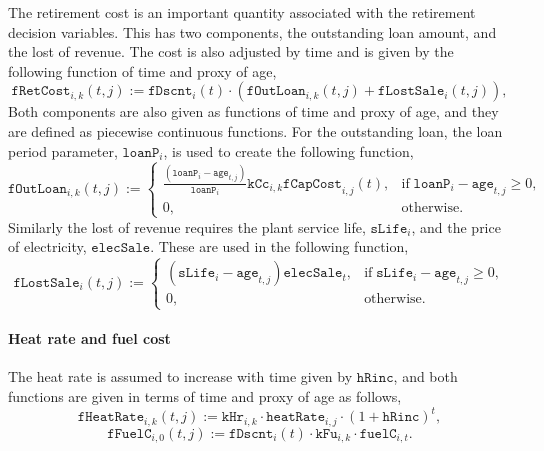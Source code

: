 \documentclass{amsart}
\begin{document}
\begin{appendices}
%
The retirement cost is an important quantity associated with the retirement
decision variables. This has two components, the outstanding loan amount, and
the lost of revenue. The cost is also adjusted by time and is given by the 
following function of time and proxy of age,
%
\begin{equation}
    \mathtt{fRetCost}_{i,k}\!\left(t,j\right):= 
    \mathtt{fDscnt}_i\!\left(t\right) \cdot
    \left(
    \mathtt{fOutLoan}_{i,k}\!\left(t,j\right) +
    \mathtt{fLostSale}_i\!\left(t,j\right)
    \right),
\end{equation}
%
Both components are also given as functions of time and proxy of age, and they
are defined as piecewise continuous functions. For the outstanding loan, the
loan period parameter, $\mathtt{loanP}_i$, is used to create the following
function,
%
\begin{equation}
    \mathtt{fOutLoan}_{i,k}\!\left(t,j\right) :=
    \left\{
        \begin{matrix}
            \frac{\left(\mathtt{loanP}_i - \mathtt{age}_{t,j}\right)}
            {\mathtt{loanP}_i} 
            \mathtt{kCc}_{i,k} \mathtt{fCapCost}_{i,j}(t), & 
            \text{if}\; \mathtt{loanP}_i-\mathtt{age}_{t,j}\geq 0 ,\\
            0, & \text{otherwise}.
        \end{matrix}
    \right.
\end{equation}
%
Similarly the lost of revenue requires the plant service life, 
$\mathtt{sLife}_i$, and the price of electricity, $\mathtt{elecSale}$. These
are used in the following function,
%
\begin{equation}
    \mathtt{fLostSale}_i\!\left(t,j\right) :=
    \left\{
        \begin{matrix}
            \left(\mathtt{sLife}_i - \mathtt{age}_{t,j}\right) 
            \mathtt{elecSale}_t, & 
            \text{if}\; \mathtt{sLife}_i-\mathtt{age}_{t,j} \geq 0 ,\\
            0, & \text{otherwise}.
        \end{matrix}
    \right.
\end{equation}
%
    \paragraph{Heat rate and fuel cost}
%
The heat rate is assumed to increase with time given by $\mathtt{hRinc}$, and 
both functions are given in terms of time and proxy of age as follows,
\begin{equation}
    \mathtt{fHeatRate}_{i,k}\!\left(t,j\right) := 
    \mathtt{kHr}_{i,k} \cdot
    \mathtt{heatRate}_{i,j} \cdot {\left(1+\mathtt{hRinc}\right)}^t
    \label{eq:f_hr},
\end{equation}
%
\begin{equation}
    \mathtt{fFuelC}_{i,0}\! \left(t,j\right) :=
    \mathtt{fDscnt}_i\! \left(t\right) \cdot 
    \mathtt{kFu}_{i,k} \cdot
    \mathtt{fuelC}_{i,t}. 
\end{equation}
%

\end{appendices}
\end{document}
